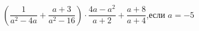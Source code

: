 \begin{ex}
	\begin{condition}
		\( \left( \dfrac{1}{a^2-4a}+\dfrac{a+3}{a^2-16} \right)\cdot\dfrac{4a-a^2}{a+2}+\dfrac{a+8}{a+4} \),\hspace{0.5cm}если \( a=-5 \)
	\end{condition}
\end{ex}